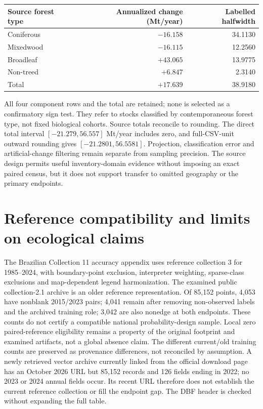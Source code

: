 \begin{center}\small
\begin{tabular}{lrr}\toprule
Source forest type & Annualized change (Mt/year) & Labelled halfwidth\\\midrule
Coniferous & $-16.158$ & 34.1130\\
Mixedwood & $-16.115$ & 12.2560\\
Broadleaf & $+43.065$ & 13.9775\\
Non-treed & $+6.847$ & 2.3140\\
Total & $+17.639$ & 38.9180\\\bottomrule
\end{tabular}\end{center}

All four component rows and the total are retained; none is selected as a confirmatory sign test. They refer to stocks classified by contemporaneous forest type, not fixed biological cohorts. Source totals reconcile to rounding. The direct total interval $[-21.279,56.557]$ Mt/year includes zero, and full-CSV-unit outward rounding gives $[-21.2801,56.5581]$. Projection, classification error and artificial-change filtering remain separate from sampling precision. The source design permits useful inventory-domain evidence without imposing an exact paired census, but it does not support transfer to omitted geography or the primary endpoints.

\section{Reference compatibility and limits on ecological claims}
The Brazilian Collection 11 accuracy appendix uses reference collection 3 for 1985--2024, with boundary-point exclusion, interpreter weighting, sparse-class exclusions and map-dependent legend harmonization. The examined public collection-2.1 archive is an older reference representation. Of 85,152 points, 4,053 have nonblank 2015/2023 pairs; 4,041 remain after removing non-observed labels and the archived training role; 3,042 are also nonedge at both endpoints. These counts do not certify a compatible national probability-design sample. Local zero paired-reference eligibility remains a property of the original footprint and examined artifacts, not a global absence claim. The different current/old training counts are preserved as provenance differences, not reconciled by assumption. A newly retrieved vector archive currently linked from the official download page has an October 2026 URL but 85,152 records and 126 fields ending in 2022; no 2023 or 2024 annual fields occur. Its recent URL therefore does not establish the current reference collection or fill the endpoint gap. The DBF header is checked without expanding the full table.

